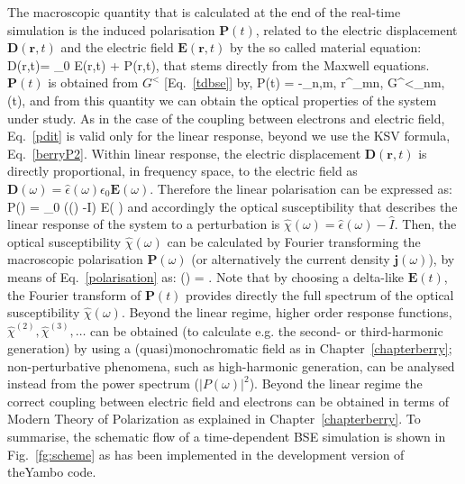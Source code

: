 The macroscopic quantity that is calculated at the end of the real-time
simulation is the induced polarisation $\mathbf P(t)$, related to the electric displacement $\mathbf D(\mathbf r,t)$ and the electric field $\mathbf
E(\mathbf r,t)$ by the so called material equation:
\be
\mathbf D(r,t)= \epsilon_0 \mathbf E(r,t) + \mathbf P(r,t),
\ee
that stems directly from the Maxwell equations.
$\mathbf P(t)$ is obtained from $G^<$ [Eq.~\eqref{tdbse}] by,
\be
\label{pdit}
\mathbf P(t) = -\sum_{n,m,\kk}  r^{}_{mn,\kk} G^<_{nm,\kk}(t),
\ee
and from this quantity we can obtain the optical properties of the system under study.
As in the case of the coupling between electrons and electric field, Eq.~\ref{pdit} is valid only for the linear response,
beyond we use the KSV formula, Eq.~\eqref{berryP2}.
Within linear response, the electric displacement $\mathbf D(\mathbf r,t)$ is directly proportional, in frequency space, to the electric field as $\mathbf
D(\omega) = \hat \epsilon(\omega) \epsilon_0 \mathbf E(\omega)$.  Therefore the linear polarisation can be expressed as:
\be
\mathbf P(\omega) = \epsilon_0 (\hat \epsilon(\omega) -\hat I)  \mathbf E( \omega) 
\label{polarisation}
\ee
and accordingly the optical susceptibility that describes the linear response of the system to a perturbation is $ \hat \chi(\omega) = \hat \epsilon(\omega) -\hat I$. 
Then, the optical susceptibility $\hat \chi(\omega)$ can be calculated 
by Fourier transforming the macroscopic polarisation $\mathbf P(\omega)$ (or alternatively the current density $\mathbf j(\omega)$),
by means of Eq.~\eqref{polarisation} as: 
\be
\label{chiomega}
\hat \chi(\omega) = .
\ee
Note that by choosing a delta-like $\mathbf E(t)$, the Fourier transform of $\mathbf P(t)$ provides directly the full spectrum of the optical susceptibility $\hat \chi(\omega)$.
Beyond the linear regime, higher order response functions, $\hat \chi^{(2)}, \hat \chi^{(3)},\dots$ can be 
obtained (to calculate e.g. the second- or third-harmonic generation) by using a (quasi)monochromatic field as in Chapter~\ref{chapterberry}; 
non-perturbative phenomena, such as high-harmonic generation, can be analysed instead from the power spectrum ($|P(\omega)|^2$).
Beyond the linear regime the correct coupling between electric field and electrons can be obtained in terms of Modern Theory of Polarization as explained in Chapter~\ref{chapterberry}.
To summarise, the schematic flow of a time-dependent BSE simulation  
is shown in Fig.~\ref{fg:scheme} as has been implemented in the
development version of the{\sc Yambo} code.~\cite{yambo}  

